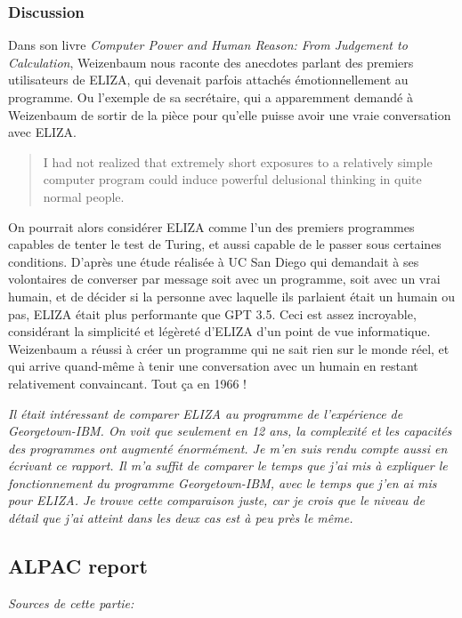 \documentclass[11pt, a4paper]{report}
\begin{document}
      \subsubsection{Discussion}
Dans son livre \textit{Computer Power and Human Reason: From Judgement to Calculation}, 
Weizenbaum nous raconte des anecdotes parlant des premiers utilisateurs de ELIZA, 
qui devenait parfois attachés émotionnellement au programme. Ou l'exemple de sa 
secrétaire, qui a apparemment demandé à Weizenbaum de sortir de la pièce pour qu'elle 
puisse avoir une vraie conversation avec ELIZA.  

\begin{quote}
  I had not realized that extremely short exposures to a relatively simple computer program could 
  induce powerful delusional thinking in quite normal people.
  \cite{weizenbaum-book}
\end{quote}

On pourrait alors considérer ELIZA comme l'un des premiers programmes capables de tenter 
le test de Turing, et aussi capable de le passer sous certaines conditions. 
D'après une étude réalisée à UC San Diego \cite{eliza-gpt} qui demandait à ses volontaires de converser 
par message soit avec un programme, soit avec un vrai humain, et de décider si la personne 
avec laquelle ils parlaient était un humain ou pas, ELIZA était plus performante que GPT 3.5. 
Ceci est assez incroyable, considérant la simplicité et légèreté d'ELIZA d'un point de vue 
informatique. Weizenbaum a réussi à créer un programme qui ne sait rien sur le monde réel, 
et qui arrive quand-même à tenir une conversation avec un humain en restant relativement 
convaincant. Tout ça en 1966 ! 

\textit{Il était intéressant de comparer ELIZA au programme de l'expérience de Georgetown-IBM. 
On voit que seulement en 12 ans, la complexité et les capacités des programmes ont augmenté 
énormément. Je m'en suis rendu compte aussi en écrivant ce rapport. Il m'a suffit de comparer 
le temps que j'ai mis à expliquer le fonctionnement du programme Georgetown-IBM, avec le temps 
que j'en ai mis pour ELIZA. Je trouve cette comparaison juste, car je crois que le niveau de 
détail que j'ai atteint dans les deux cas est à peu près le même. }


  \subsection{ALPAC report} 
  \textit{Sources de cette partie:} \newline
  \cite[L'article original]{alpac-original} \newline
  \cite[ALPAC: The (in)famous report]{alpac-hutchins} \newline
\end{document}
